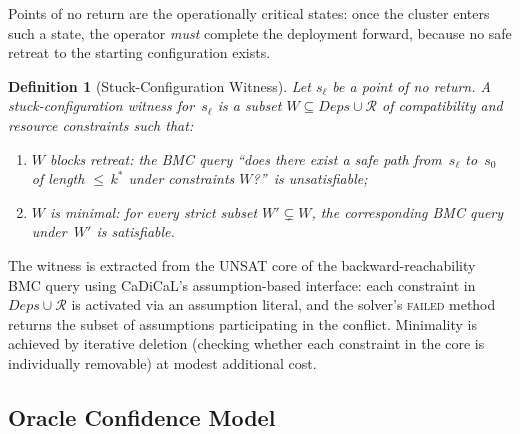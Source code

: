 \documentclass[10pt,twocolumn]{article}
\newtheorem{definition}[theorem]{Definition}
\begin{document}
\noindent
Points of no return are the operationally critical states: once the cluster
enters such a state, the operator \emph{must} complete the deployment
forward, because no safe retreat to the starting configuration exists.

\begin{definition}[Stuck-Configuration Witness]
\label{def:witness}
Let $s_\ell$ be a point of no return.  A \emph{stuck-configuration
witness} for~$s_\ell$ is a subset
$W \subseteq \mathit{Deps} \cup \mathcal{R}$ of compatibility and resource
constraints such that:
\begin{enumerate}
\item $W$ \emph{blocks retreat}: the BMC query ``does there exist a safe
  path from~$s_\ell$ to~$s_0$ of length ${\leq}\, k^*$ under constraints
  $W$?''\ is unsatisfiable;
\item $W$ is \emph{minimal}: for every strict subset $W' \subsetneq W$,
  the corresponding BMC query under~$W'$ is satisfiable.
\end{enumerate}
\end{definition}

\noindent
The witness is extracted from the UNSAT core of the backward-reachability
BMC query using CaDiCaL's assumption-based interface: each constraint in
$\mathit{Deps} \cup \mathcal{R}$ is activated via an assumption literal,
and the solver's \textsc{failed} method returns the subset of assumptions
participating in the conflict.  Minimality is achieved by iterative
deletion (checking whether each constraint in the core is individually
removable) at modest additional cost.

\subsection{Oracle Confidence Model}
\label{sec:formal:oracle}
\end{document}

